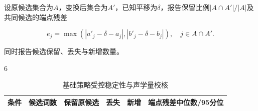 设原候选集合为\(A\)，变换后集合为\(A'\)，已知平移为\(\delta\)，报告保留比例\(|A\cap A'|/|A|\)及共同候选的端点残差

\begin{equation}e_j=\max\left(|a'_j-\delta-a_j|,|b'_j-\delta-b_j|\right),\quad j\in A\cap A'.\end{equation}

同时报告候选保留、丢失与新增数量。

\begin{PaperTable}{6}

\begin{table}[!htbp]
\centering\caption{基础策略受控稳定性与声学量校核}
\begin{tabular}{@{}lrrrrl@{}}
\toprule
\begin{minipage}[b]{\dimexpr 0.300000\linewidth-3.000000\tabcolsep\relax}\raggedright
条件\strut
\end{minipage} & \begin{minipage}[b]{\dimexpr 0.120000\linewidth-1.200000\tabcolsep\relax}\raggedleft
候选词数\strut
\end{minipage} & \begin{minipage}[b]{\dimexpr 0.150000\linewidth-1.500000\tabcolsep\relax}\raggedleft
保留原候选\strut
\end{minipage} & \begin{minipage}[b]{\dimexpr 0.080000\linewidth-0.800000\tabcolsep\relax}\raggedleft
丢失\strut
\end{minipage} & \begin{minipage}[b]{\dimexpr 0.080000\linewidth-0.800000\tabcolsep\relax}\raggedleft
新增\strut
\end{minipage} & \begin{minipage}[b]{\dimexpr 0.270000\linewidth-2.700000\tabcolsep\relax}\raggedright
端点残差中位数/95分位\strut
\end{minipage}\tabularnewline
\midrule


\end{tabular}
\end{table}
\end{PaperTable}
